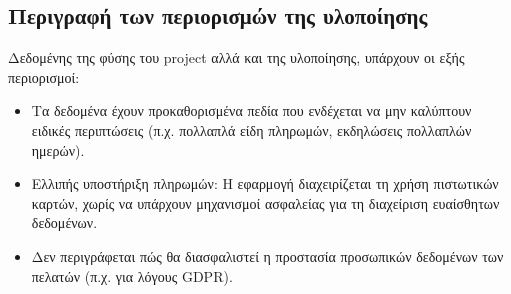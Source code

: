 \documentclass{article}
\begin{document}
\subsection*{Περιγραφή των περιορισμών της υλοποίησης}
Δεδομένης της φύσης του project αλλά και της υλοποίησης, υπάρχουν οι εξής περιορισμοί:
\begin{itemize}
\item Τα δεδομένα έχουν προκαθορισμένα πεδία που ενδέχεται να μην καλύπτουν ειδικές περιπτώσεις (π.χ. πολλαπλά είδη πληρωμών, εκδηλώσεις πολλαπλών ημερών).
\item Ελλιπής υποστήριξη πληρωμών: Η εφαρμογή διαχειρίζεται τη χρήση πιστωτικών καρτών, χωρίς να υπάρχουν μηχανισμοί ασφαλείας για τη διαχείριση ευαίσθητων δεδομένων.
\item Δεν περιγράφεται πώς θα διασφαλιστεί η προστασία προσωπικών δεδομένων των πελατών (π.χ. για λόγους GDPR).
\end{itemize}
\end{document}
